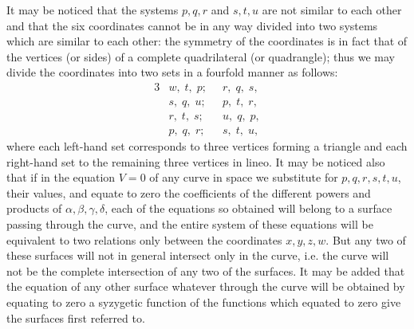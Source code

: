 \documentclass[11pt,a4paper]{article}
\theoremstyle{plain}
\begin{document}
It may be noticed that the systems $p, q, r$ and $s, t, u$ are not similar to each other and that the six coordinates cannot be in any way divided into two systems which are similar to each other: the symmetry of the coordinates is in fact that of the vertices (or sides) of a complete quadrilateral (or quadrangle); thus we may divide the coordinates into two sets in a fourfold manner as follows:
\begin{alignat*}{3}
&w,\; t,\; p;\; &\; r,\; q,\; s,\\
&s,\; q,\; u;\; &\; p,\; t,\; r,\\
&r,\; t,\; s;\; &\; u,\; q,\; p,\\
&p,\; q,\; r;\; &\; s,\; t,\; u,
\end{alignat*}
where each left-hand set corresponds to three vertices forming a triangle and each right-hand set to the remaining three vertices in lineo. It may be noticed also that if in the equation $V = 0$ of any curve in space we substitute for $p, q, r, s, t, u$, their values, and equate to zero the coefficients of the different powers and products of $\alpha, \beta, \gamma, \delta$, each of the equations so obtained will belong to a surface passing through the curve, and the entire system of these equations will be equivalent to two relations only between the coordinates $x, y, z, w$. But any two of these surfaces will not in general intersect only in the curve, i.e. the curve will not be the complete intersection of any two of the surfaces. It may be added that the equation of any other surface whatever through the curve will be obtained by equating to zero a syzygetic function of the functions which equated to zero give the surfaces first referred to.
\end{document}
